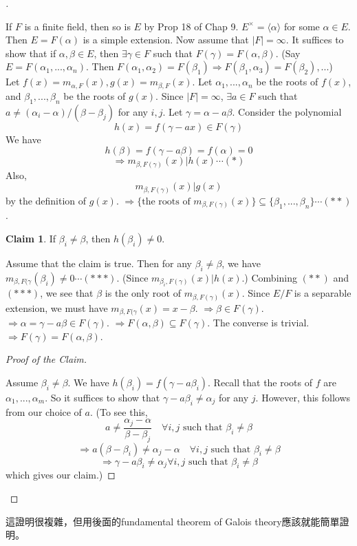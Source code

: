 \documentclass[12pt]{article}
\theoremstyle{definition}
\newtheorem*{clm}{Claim}
\newenvironment{proofs}[1][\proofname]{%
  \begin{proof}[#1]$ $\par\nobreak\ignorespaces
}{%
  \end{proof}
}
\begin{document}
\begin{proofs}
	If $F$ is a finite field, then so is $E$ by Prop 18 of Chap 9.
	$E^\times = \langle \alpha \rangle$ for some $\alpha \in E$.
	Then $E = F(\alpha)$ is a simple extension.
	Now assume that $|F| = \infty$.
	It suffices to show that if $\alpha, \beta \in E$, then $\exists \gamma \in F$ such that $F(\gamma) = F(\alpha, \beta)$.
	(Say $E = F(\alpha_1, ..., \alpha_n)$.
	Then $F(\alpha_1, \alpha_2) = F(\beta_1) \Rightarrow F(\beta_1, \alpha_3) = F(\beta_2), ...$)\\
	Let $f(x) = m_{\alpha, F}(x), g(x) = m_{\beta, F}(x)$.
	Let $\alpha_1, ..., \alpha_n$ be the roots of $f(x)$, and $\beta_1, ..., \beta_n$ be the roots of $g(x)$.
	Since $|F| = \infty$, $\exists a \in F$ such that $a \neq (\alpha_i - \alpha)/(\beta - \beta_j)$ for any $i, j$.
	Let $\gamma = \alpha - a \beta$.
	Consider the polynomial
	\[
		h(x) = f(\gamma - ax) \in F(\gamma)
	\]
	We have
	\[
		h(\beta) = f(\gamma - a \beta) = f(\alpha) = 0
	\]
	\[
		\Rightarrow m_{\beta, F(\gamma)}(x) | h(x) \cdots (*)
	\]
	Also,
	\[
		m_{\beta, F(\gamma)}(x) | g(x)
	\]
	by the definition of $g(x)$.
	$\Rightarrow \{\text{the roots of }m_{\beta, F(\gamma)}(x)\} \subseteq \{\beta_1, ..., \beta_n\} \cdots (**)$.
	\begin{clm}
		If $\beta_i \neq \beta$, then $h(\beta_i) \neq 0$.
	\end{clm}
	Assume that the claim is true.
	Then for any $\beta_i \neq \beta$, we have $m_{\beta, F(\gamma}(\beta_i) \neq 0 \cdots (***)$.
	(Since $m_{\beta_i, F(\gamma)}(x) | h(x)$.)
	Combining $(**)$ and $(***)$, we see that $\beta$ is the only root of $m_{\beta, F(\gamma)}(x)$.
	Since $E/F$ is a separable extension, we must have $m_{\beta, F(\gamma}(x) = x - \beta$.
	$\Rightarrow \beta \in F(\gamma)$.
	$\Rightarrow \alpha = \gamma - a \beta \in F(\gamma)$.
	$\Rightarrow F(\alpha, \beta) \subseteq F(\gamma)$.
	The converse is trivial.
	$\Rightarrow F(\gamma) = F(\alpha, \beta)$.
	\begin{proofs}[Proof of the Claim]
		Assume $\beta_i \neq \beta$.
		We have $h(\beta_i) = f(\gamma - a \beta_i)$.
		Recall that the roots of $f$ are $\alpha_1, ..., \alpha_m$.
		So it suffices to show that $\gamma - a \beta_i \neq \alpha_j$ for any $j$.
		However, this follows from our choice of $a$.
		(To see this,
		\[
			a \neq \frac{\alpha_j - \alpha}{\beta - \beta_j} \quad \forall i, j \text{ such that } \beta_i \neq \beta
		\]
		\[
			\Rightarrow a(\beta - \beta_i) \neq \alpha_j - \alpha \quad \forall i, j \text{ such that } \beta_i \neq \beta
		\]
		\[
			\Rightarrow \gamma - a \beta_i \neq \alpha_j \forall i, j \text{ such that } \beta_i \neq \beta
		\]
		which gives our claim.)
	\end{proofs}
\end{proofs}
這證明很複雜，但用後面的fundamental theorem of Galois theory應該就能簡單證明。
\end{document}
